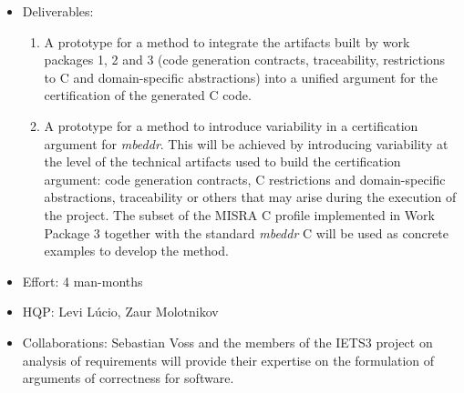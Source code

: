 \begin{itemize}
  \item Deliverables:
  \begin{enumerate}
    \item A prototype for a method to integrate the artifacts built by work
    packages 1, 2 and 3 (code generation contracts, traceability, restrictions to C and
domain-specific abstractions) into a unified argument for the certification of
the generated C code.
\item A prototype for a method to introduce variability in a certification
argument for \emph{mbeddr}. This will be achieved by introducing variability at
the level of the technical artifacts used to build the certification argument:
code generation contracts, C restrictions and domain-specific abstractions,
traceability or others that may arise during the execution of the project. The
subset of the MISRA C profile implemented in Work Package 3 together with the
standard \emph{mbeddr} C will be used as concrete examples to develop the
method.
  \end{enumerate}
  \item Effort: 4 man-months
  \item HQP: Levi L\'ucio, Zaur Molotnikov
  \item Collaborations: Sebastian Voss and the members of the IETS3 project on
  analysis of requirements will provide their expertise on the formulation of
  arguments of correctness for software.
\end{itemize}